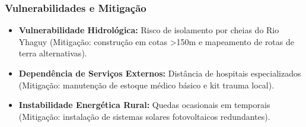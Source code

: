 \subsubsection{Vulnerabilidades e
Mitigação}

\begin{itemize}
\tightlist
\item
  \textbf{Vulnerabilidade Hidrológica:} Risco de isolamento por cheias
  do Rio Yhaguy (Mitigação: construção em cotas \textgreater150m e
  mapeamento de rotas de terra alternativas).
\item
  \textbf{Dependência de Serviços Externos:} Distância de hospitais
  especializados (Mitigação: manutenção de estoque médico básico e kit
  trauma local).
\item
  \textbf{Instabilidade Energética Rural:} Quedas ocasionais em
  temporais (Mitigação: instalação de sistemas solares fotovoltaicos
  redundantes).
\end{itemize}

